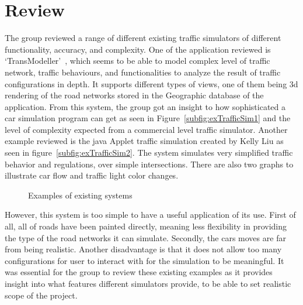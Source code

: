 \documentclass[11pt]{article}
\begin{document}
\section{Review} %

The group reviewed a range of different existing traffic simulators of different functionality, accuracy, and complexity. One of the application reviewed is   ‘TransModeller’~\cite{TransM}, which seems to be able to model complex level of traffic network, traffic behaviours, and functionalities to analyze the result of traffic configurations in depth. It supports different types of views, one of them being 3d rendering of the road networks stored in the Geographic database of the application. From this system, the group got an insight to how sophisticated a car simulation program can get as seen in Figure~\ref{subfig:exTrafficSim1} and the level of complexity expected from a commercial level traffic simulator.  Another example reviewed is the java Applet traffic simulation created by Kelly Liu \cite{Kelly} as seen in figure~\ref{subfig:exTrafficSim2}. The system simulates very simplified traffic behavior and regulations, over simple intersections. There are also two graphs to illustrate car flow and traffic light color changes.
\begin{figure}[!htb]
		\caption[short for lof]{Examples of existing systems}
		\label{fig:Existing Applications}
	\end{figure}

However, this system is too simple to have a useful application of its use. First of all, all of roads have been painted directly, meaning less flexibility in providing the type of the road networks it can simulate. Secondly, the cars moves are far from being realistic. Another disadvantage is that it does not allow too many configurations for user to interact with for the simulation to be meaningful. It was essential for the group to review these existing examples as it provides insight into what features different simulators provide, to be able to set realistic scope of the project.
\newpage
\end{document}
